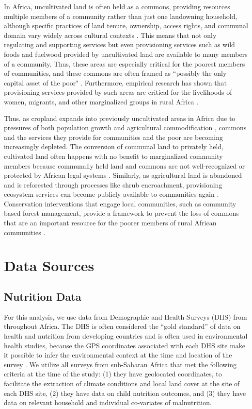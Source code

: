\documentclass{article}
\begin{document}
In Africa, uncultivated land is often held as a commons, providing resources multiple members of a community rather than just one landowning household, although specific practices of land tenure, ownership, access rights, and communal domain vary widely across cultural contexts \cite{Wily2008}.  This means that not only regulating and supporting services but even provisioning services such as wild foods and fuelwood provided by uncultivated land are available to many members of a community.  Thus, these areas are especially critical for the poorest members of communities, and these commons are often framed as ``possibly the only capital asset of the poor" \cite{Wily2008}.  Furthermore, empirical research has shown that provisioning services provided by such areas are critical for the livelihoods of women, migrants, and other marginalized groups in rural Africa \cite{Coulibaly-Lingani2009, Pouliot2013}.

Thus, as cropland expands into previously uncultivated areas in Africa due to pressures of both population growth and agricultural commodification \cite{Rudel2013, Laurance2014}, commons and the services they provide for communities and the poor are becoming increasingly depleted.  The conversion of communal land to privately held, cultivated land often happens with no benefit to marginalized community members because communally held land and commons are not well-recognized or protected by African legal systems \cite{Wily2011}.  Similarly, as agricultural land is abandoned and is reforested through processes like shrub encroachment, provisioning ecosystem services can become publicly available to communities again \cite{Laris2008, Eldridge2011, Venter2018}.  Conservation interventions that engage local communities, such as community based forest management, provide a framework to prevent the loss of commons that are an important resource for the poorer members of rural African communities \cite{bray2003mexico}.

\section{Data Sources}

\subsection{Nutrition Data}
For this analysis, we use data from Demographic and Health Surveys (DHS) from throughout Africa.  The DHS is often considered the ``gold standard'' of data on health and nutrition from developing countries and is often used in environmental health studies, because the GPS coordinates associated with each DHS site make it possible to infer the environmental context at the time and location of the survey \cite{Brown2014}.  We utilize all surveys from sub-Saharan Africa that met the following criteria at the time of the study: (1) they have geolocated coordinates, to facilitate the extraction of climate conditions and local land cover at the site of each DHS site, (2) they have data on child nutrition outcomes, and (3) they have data on relevant household and individual co-variates of malnutrition.
\end{document}
